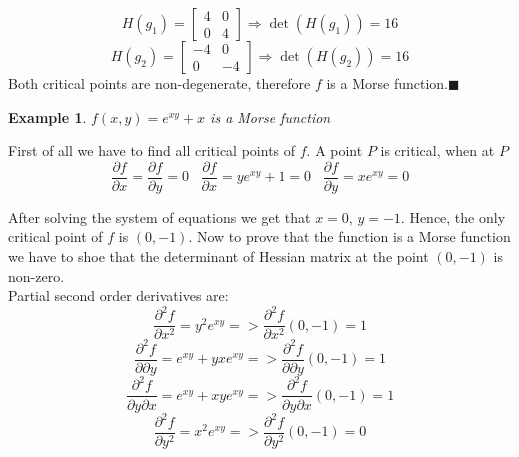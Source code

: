 \documentclass[]{article}
\newtheorem{example}{Example}
\newcommand{\imply}{\Rightarrow}
\begin{document}
\begin{equation}
	H(g_1) = \begin{bmatrix} 4 & 0 \\ 0 & 4 \end{bmatrix}
	\imply \det(H(g_1)) = 16
\end{equation}
\begin{equation}
	H(g_2) = \begin{bmatrix} -4 & 0 \\ 0 & -4 \end{bmatrix}
	\imply \det(H(g_2)) =  16
\end{equation}
Both critical points are non-degenerate, therefore $f$ is a Morse function.$\blacksquare$\\
\begin{example}
$f(x,y)=e^{xy}+x$ is a Morse function
\end{example}
First of all we have to find all critical points of $f$. A point $P$ is critical, when at $P$ 
\begin{equation}
\frac{\partial f}{\partial x}=\frac{\partial f}{\partial y}=0\;\;\;
\frac{\partial f}{\partial x}= ye^{xy}+1=0 \;\;\;
\frac{\partial f}{\partial y}=xe^{xy}=0
\end{equation}

After solving the system of equations we get that $x=0$, $y=-1$. Hence, the only critical point of $f$ is $(0,-1)$. Now to prove that the function is a Morse function we have to shoe that the determinant of Hessian matrix at the point $(0,-1)$ is non-zero. \\
Partial second order derivatives are: 
\begin{equation}
 \frac{\partial^2 f}{\partial x^2}=y^2e^{xy}  =>
\frac{\partial^2 f}{\partial x^2}(0,-1)=1    
\end{equation}
\begin{equation}
\frac{\partial^2 f}{\partial \partial y}=e^{xy}+yxe^{xy} =>
\frac{\partial^2 f}{\partial \partial y}(0,-1)=1  
\end{equation}
\begin{equation}
\frac{\partial^2 f}{\partial y \partial x}=e^{xy}+xye^{xy} =>
\frac{\partial^2 f}{\partial y \partial x}(0,-1)=1    
\end{equation}
\begin{equation}
\frac{\partial^2 f}{\partial y^2}=x^2e^{xy}=>
\frac{\partial^2 f}{\partial y^2}(0,-1)=0
\end{equation}
\end{document}
